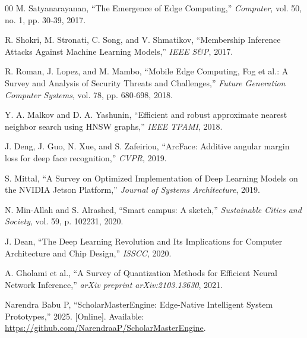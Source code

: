 \documentclass[conference]{IEEEtran}
\begin{document}
\begin{thebibliography}{00}
 M. Satyanarayanan, ``The Emergence of Edge Computing,'' \textit{Computer}, vol. 50, no. 1, pp. 30-39, 2017.

 R. Shokri, M. Stronati, C. Song, and V. Shmatikov, ``Membership Inference Attacks Against Machine Learning Models,'' \textit{IEEE S\&P}, 2017.

 R. Roman, J. Lopez, and M. Mambo, ``Mobile Edge Computing, Fog et al.: A Survey and Analysis of Security Threats and Challenges,'' \textit{Future Generation Computer Systems}, vol. 78, pp. 680-698, 2018.

 Y. A. Malkov and D. A. Yashunin, ``Efficient and robust approximate nearest neighbor search using HNSW graphs,'' \textit{IEEE TPAMI}, 2018.

 J. Deng, J. Guo, N. Xue, and S. Zafeiriou, ``ArcFace: Additive angular margin loss for deep face recognition,'' \textit{CVPR}, 2019.

 S. Mittal, ``A Survey on Optimized Implementation of Deep Learning Models on the NVIDIA Jetson Platform,'' \textit{Journal of Systems Architecture}, 2019.

 N. Min-Allah and S. Alrashed, ``Smart campus: A sketch,'' \textit{Sustainable Cities and Society}, vol. 59, p. 102231, 2020.

 J. Dean, ``The Deep Learning Revolution and Its Implications for Computer Architecture and Chip Design,'' \textit{ISSCC}, 2020.

 A. Gholami et al., ``A Survey of Quantization Methods for Efficient Neural Network Inference,'' \textit{arXiv preprint arXiv:2103.13630}, 2021.

 Narendra Babu P, ``ScholarMasterEngine: Edge-Native Intelligent System Prototypes,'' 2025. [Online]. Available: \url{https://github.com/NarendraaP/ScholarMasterEngine}.

\end{thebibliography}
\end{document}
